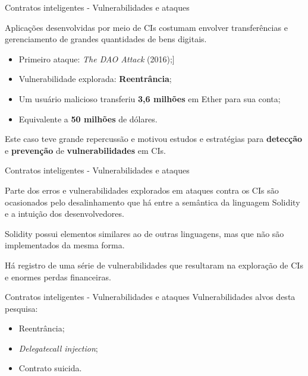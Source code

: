 \begin{frame}{Contratos inteligentes - Vulnerabilidades e ataques}
    \begin{block}{}
    Aplicações desenvolvidas por meio de CIs costumam envolver transferências e gerenciamento de grandes quantidades de bens digitais.
    \end{block}
    \begin{itemize}
        \item Primeiro ataque: \textit{The DAO Attack} (2016);]
        \item Vulnerabilidade explorada: \textbf{Reentrância};
        \item Um usuário malicioso transferiu \textbf{3,6 milhões} em Ether para sua conta;
        \item Equivalente a \textbf{50 milhões} de dólares.
    \end{itemize}
    \begin{block}{}
    Este caso teve grande repercussão e motivou estudos e estratégias para \textbf{detecção} e \textbf{prevenção} de \textbf{vulnerabilidades} em CIs. 
    \end{block}
\end{frame}

\begin{frame}{Contratos inteligentes - Vulnerabilidades e ataques}
    \begin{block}{}
    Parte dos erros e vulnerabilidades explorados em ataques contra os CIs são ocasionados pelo desalinhamento que há entre a semântica da linguagem Solidity e a intuição dos desenvolvedores.
    \end{block}
    \begin{block}{}
    Solidity possui elementos similares ao de outras linguagens, mas que não são implementados da mesma forma.
    \end{block}
    \begin{exampleblock}{}
    Há registro de uma série de vulnerabilidades que resultaram na exploração de CIs e enormes perdas financeiras.
    \end{exampleblock}
\end{frame}

\begin{frame}{Contratos inteligentes - Vulnerabilidades e ataques}
    Vulnerabilidades alvos desta pesquisa:
    \begin{itemize}
        \item Reentrância;
        \item \textit{Delegatecall injection};
        \item Contrato suicida.
    \end{itemize}
\end{frame}

